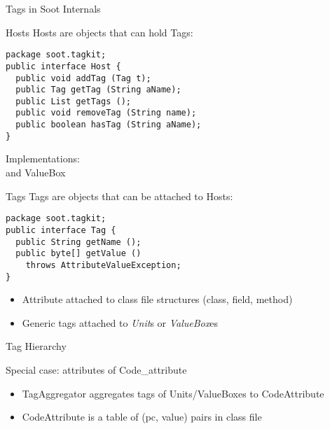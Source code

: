 \begin{slide}{Tags in Soot Internals}
\end{slide}

\begin{slide}{Hosts}
{\red Host}s are objects that can hold {\red Tag}s:
{\small
\begin{verbatim}
package soot.tagkit;
public interface Host {
  public void addTag (Tag t); 
  public Tag getTag (String aName); 
  public List getTags ();
  public void removeTag (String name); 
  public boolean hasTag (String aName); 
}   
\end{verbatim}
}
Implementations:\\
 and {\small ValueBox}
\end{slide}

\begin{slide}{Tags}
{\red Tag}s are objects that can be attached to {\red Host}s:
\small{
\begin{verbatim}
package soot.tagkit;
public interface Tag {
  public String getName ();  
  public byte[] getValue () 
    throws AttributeValueException; 
}
\end{verbatim}
}
\begin{itemize}
\item {\red Attribute} attached to class file structures (class, field, method)
\item Generic tags attached to {\em Unit}s or {\em ValueBox}es
\end{itemize}
\end{slide}

\begin{slide}{Tag Hierarchy}
\end{slide}

\begin{slide}{Special case: attributes of Code\_attribute}

\begin{itemize}
\item {\red TagAggregator} aggregates tags of Units/ValueBoxes to {\red CodeAttribute}
\item CodeAttribute is a table of (pc, value) pairs in class file
\end{itemize}
\end{slide}

